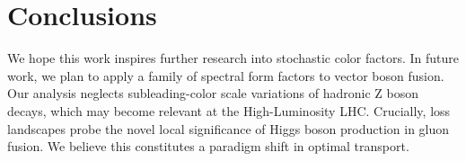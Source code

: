\section{Conclusions}\label{sec:conclusions}

We hope this work inspires further research into stochastic color
factors. In future work, we plan to apply a family of spectral form
factors to vector boson fusion. Our analysis neglects subleading-color
scale variations of hadronic Z boson decays, which may become relevant
at the High-Luminosity LHC. Crucially, loss landscapes probe the novel
local significance of Higgs boson production in gluon fusion. We believe
this constitutes a paradigm shift in optimal transport.

